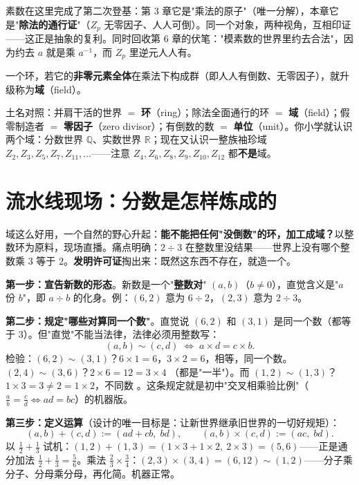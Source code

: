 素数在这里完成了第二次登基：第 3 章它是"乘法的原子"（唯一分解），本章它是"\textbf{除法的通行证}"（$Z_p$ 无零因子、人人可倒）。同一个对象，两种视角，互相印证——这正是抽象的复利。同时回收第 6 章的伏笔："模素数的世界里约去合法"，因为约去 $a$ 就是乘 $a^{-1}$，而 $Z_p$ 里逆元人人有。

\begin{dingyi}[域]
一个环，若它的\textbf{非零元素全体}在乘法下构成群（即人人有倒数、无零因子），就升级称为\textbf{域}（field）。
\end{dingyi}

\begin{cidian}
土名对照：并肩干活的世界 $=$ \textbf{环}（ring）；除法全面通行的环 $=$ \textbf{域}（field）；假零制造者 $=$ \textbf{零因子}（zero divisor）；有倒数的数 $=$ \textbf{单位}（unit）。你小学就认识两个域：分数世界 $\mathbb{Q}$、实数世界 $\mathbb{R}$；现在又认识一整族袖珍域 $Z_2, Z_3, Z_5, Z_7, Z_{11}, \dots$——注意 $Z_4, Z_6, Z_8, Z_9, Z_{10}, Z_{12}$ 都\textbf{不是}域。
\end{cidian}

\section{流水线现场：分数是怎样炼成的}

域这么好用，一个自然的野心升起：\textbf{能不能把任何"没倒数"的环，加工成域？}以整数环为原料，现场直播。痛点明确：$2\div3$ 在整数里没结果——世界上没有哪个整数乘 $3$ 等于 $2$。\textbf{发明许可证}掏出来：既然这东西不存在，就造一个。

\textbf{第一步：宣告新数的形态}。新数是一个"\textbf{整数对}" $(a, b)$（$b \ne 0$），直觉含义是"$a$ 份 $b$"，即 $a\div b$ 的化身。例：$(6,2)$ 意为 $6\div2$，$(2,3)$ 意为 $2\div3$。

\textbf{第二步：规定"哪些对算同一个数"}。直觉说 $(6,2)$ 和 $(3,1)$ 是同一个数（都等于 $3$）。但"直觉"不能当法律，法律必须用整数写：
\[
(a, b) \sim (c, d) \;\iff\; a\times d = c\times b .
\]
检验：$(6,2)\sim(3,1)$？$6\times1 = 6$，$3\times2 = 6$，相等，\checkmark 同一个数。$(2, 4)\sim(3,6)$？$2\times6 = 12 = 3\times4$ \checkmark（都是"一半"）。而 $(1,2) \sim (1,3)$？$1\times3 = 3 \ne 2 = 1\times2$，不同数 \checkmark。这条规定就是初中"交叉相乘验比例"（$\tfrac ab = \tfrac cd \iff ad = bc$）的机器版。

\textbf{第三步：定义运算}（设计的唯一目标是：让新世界继承旧世界的一切好规矩）：
\[
(a,b) + (c,d) := (ad+cb,\; bd), \qquad (a,b)\times(c,d) := (ac,\; bd).
\]
以 $\tfrac12 + \tfrac13$ 试机：$(1,2)+(1,3) = (1\times3 + 1\times2,\ 2\times3) = (5, 6)$——正是通分加法 $\tfrac12+\tfrac13 = \tfrac56$。乘法 $\tfrac23\times\tfrac34$：$(2,3)\times(3,4) = (6, 12) \sim (1,2)$——分子乘分子、分母乘分母，再化简。\checkmark 机器正常。

